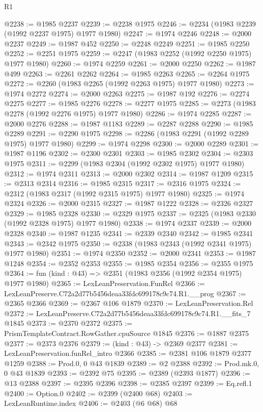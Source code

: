 \begin{lexlean}{R1}
\begin{coremodule}
@2238 := @1985 @2237
@2239 := @2238 @1975
@2246 := @2234 (@1983 @2239 (@1992 @2237 @1975) @1977 @1980)
@2247 := @1974 @2246
@2248 := @2000 @2237
@2249 := @1987 @452
@2250 := @2248 @2249
@2251 := @1985 @2250
@2252 := @2251 @1975
@2259 := @2247 (@1983 @2252 (@1992 @2250 @1975) @1977 @1980)
@2260 := @1974 @2259
@2261 := @2000 @2250
@2262 := @1987 @499
@2263 := @2261 @2262
@2264 := @1985 @2263
@2265 := @2264 @1975
@2272 := @2260 (@1983 @2265 (@1992 @2263 @1975) @1977 @1980)
@2273 := @1974 @2272
@2274 := @2000 @2263
@2275 := @1987 @192
@2276 := @2274 @2275
@2277 := @1985 @2276
@2278 := @2277 @1975
@2285 := @2273 (@1983 @2278 (@1992 @2276 @1975) @1977 @1980)
@2286 := @1974 @2285
@2287 := @2000 @2276
@2288 := @1987 @1183
@2289 := @2287 @2288
@2290 := @1985 @2289
@2291 := @2290 @1975
@2298 := @2286 (@1983 @2291 (@1992 @2289 @1975) @1977 @1980)
@2299 := @1974 @2298
@2300 := @2000 @2289
@2301 := @1987 @1196
@2302 := @2300 @2301
@2303 := @1985 @2302
@2304 := @2303 @1975
@2311 := @2299 (@1983 @2304 (@1992 @2302 @1975) @1977 @1980)
@2312 := @1974 @2311
@2313 := @2000 @2302
@2314 := @1987 @1209
@2315 := @2313 @2314
@2316 := @1985 @2315
@2317 := @2316 @1975
@2324 := @2312 (@1983 @2317 (@1992 @2315 @1975) @1977 @1980)
@2325 := @1974 @2324
@2326 := @2000 @2315
@2327 := @1987 @1222
@2328 := @2326 @2327
@2329 := @1985 @2328
@2330 := @2329 @1975
@2337 := @2325 (@1983 @2330 (@1992 @2328 @1975) @1977 @1980)
@2338 := @1974 @2337
@2339 := @2000 @2328
@2340 := @1987 @1235
@2341 := @2339 @2340
@2342 := @1985 @2341
@2343 := @2342 @1975
@2350 := @2338 (@1983 @2343 (@1992 @2341 @1975) @1977 @1980)
@2351 := @1974 @2350
@2352 := @2000 @2341
@2353 := @1987 @1248
@2354 := @2352 @2353
@2355 := @1985 @2354
@2356 := @2355 @1975
@2364 := fun (kind : @43) => @2351 (@1983 @2356 (@1992 @2354 @1975) @1977 @1980)
@2365 := LexLeanPreservation.FunRel
@2366 := LexLeanPreserve.C72a2d77b5456deaa33fdc699178c9c74.R1.__prog
@2367 := @2365 @2366
@2369 := @2367 @106 @1879
@2370 := LexLeanPreservation.Rel
@2372 := LexLeanPreserve.C72a2d77b5456deaa33fdc699178c9c74.R1.__fits_7 @1845
@2373 := @2370 @2372
@2375 := PrismTemplateContract.RowGather.cpuSource @1845
@2376 := @1887 @2375
@2377 := @2373 @2376
@2379 := (kind : @43) -> @2369 @2377
@2381 := LexLeanPreservation.funRel_intro @2366
@2385 := @2381 @106 @1879 @2377 @1259
@2388 := Prod.{0, 0} @43 @1839
@2389 := @2 @2388
@2392 := Prod.mk.{0, 0} @43 @1839
@2393 := @2392 @75
@2395 := @2389 (@2393 @1877)
@2396 := @13 @2388
@2397 := @2395 @2396
@2398 := @2385 @2397
@2399 := Eq.refl.{1}
@2400 := Option.{0}
@2402 := @2399 (@2400 @68)
@2403 := LexLeanRuntime.index
@2406 := @2403 (@6 @68) @68

\end{coremodule}
\end{lexlean}

